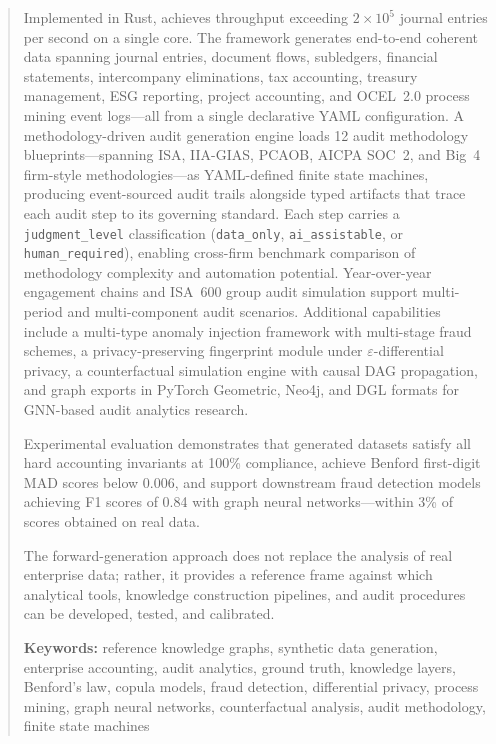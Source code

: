 \begin{abstract}
Implemented in Rust, \system{} achieves throughput exceeding $2 \times 10^5$ journal entries
per second on a single core.  The framework generates end-to-end coherent
data spanning journal entries, document flows, subledgers, financial
statements, intercompany eliminations, tax accounting, treasury
management, ESG reporting, project accounting, and OCEL~2.0 process
mining event logs---all from a single declarative YAML configuration.
A methodology-driven audit generation engine loads 12 audit methodology
blueprints---spanning ISA, IIA-GIAS, PCAOB, AICPA SOC~2, and Big~4
firm-style methodologies---as YAML-defined finite state machines,
producing event-sourced audit trails alongside typed artifacts that
trace each audit step to its governing standard.  Each step carries a
\texttt{judgment\_level} classification (\texttt{data\_only},
\texttt{ai\_assistable}, or \texttt{human\_required}), enabling
cross-firm benchmark comparison of methodology complexity and
automation potential.  Year-over-year engagement chains and ISA~600
group audit simulation support multi-period and multi-component
audit scenarios.
Additional capabilities include a multi-type anomaly injection framework
with multi-stage fraud schemes, a privacy-preserving fingerprint module
under $\varepsilon$-differential privacy, a counterfactual simulation
engine with causal DAG propagation, and graph exports in PyTorch
Geometric, Neo4j, and DGL formats for GNN-based audit analytics research.

Experimental evaluation demonstrates that generated datasets satisfy all
hard accounting invariants at 100\% compliance, achieve Benford first-digit
MAD scores below 0.006, and support downstream fraud detection models
achieving F1 scores of 0.84 with graph neural networks---within 3\% of
scores obtained on real data.

The forward-generation approach does not replace the analysis of real
enterprise data; rather, it provides a reference frame against which
analytical tools, knowledge construction pipelines, and audit
procedures can be developed, tested, and calibrated.

\medskip
\noindent\textbf{Keywords:} reference knowledge graphs, synthetic data
generation, enterprise accounting, audit analytics, ground truth,
knowledge layers, Benford's law, copula models, fraud detection,
differential privacy, process mining, graph neural networks,
counterfactual analysis, audit methodology, finite state machines
\end{abstract}
